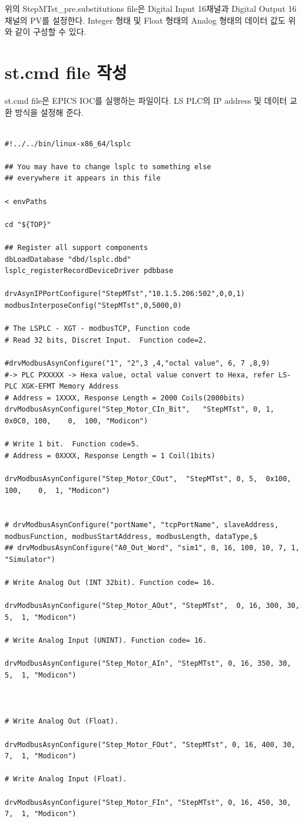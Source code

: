 \documentclass[11pt
  , a4paper
  , article
  , oneside
]{memoir}
\begin{document}
위의 StepMTst\_pre.substitutions file은 Digital Input 16채널과 Digital Output 16채널의 PV를 설정한다. Integer 형태 및 Float 형태의 Analog 형태의 데이터 값도 위와 같이 구성할 수 있다.

\section{st.cmd file 작성}

st.cmd file은 EPICS IOC를 실행하는 파일이다. LS PLC의 IP address 및 데이터 교환 방식을 설정해 준다.  

\begin{lstlisting}[style=termstyle]
	
#!../../bin/linux-x86_64/lsplc

## You may have to change lsplc to something else
## everywhere it appears in this file

< envPaths

cd "${TOP}"

## Register all support components
dbLoadDatabase "dbd/lsplc.dbd"
lsplc_registerRecordDeviceDriver pdbbase

drvAsynIPPortConfigure("StepMTst","10.1.5.206:502",0,0,1)
modbusInterposeConfig("StepMTst",0,5000,0)

# The LSPLC - XGT - modbusTCP, Function code
# Read 32 bits, Discret Input.  Function code=2.

#drvModbusAsynConfigure("1", "2",3 ,4,"octal value", 6, 7 ,8,9)
#-> PLC PXXXXX -> Hexa value, octal value convert to Hexa, refer LS-PLC XGK-EFMT Memory Address
# Address = 1XXXX, Response Length = 2000 Coils(2000bits)
drvModbusAsynConfigure("Step_Motor_CIn_Bit",   "StepMTst", 0, 1,  0x0C0, 100,    0,  100, "Modicon")

# Write 1 bit.  Function code=5.
# Address = 0XXXX, Response Length = 1 Coil(1bits)

drvModbusAsynConfigure("Step_Motor_COut",  "StepMTst", 0, 5,  0x100,  100,    0,  1, "Modicon")


# drvModbusAsynConfigure("portName", "tcpPortName", slaveAddress, modbusFunction, modbusStartAddress, modbusLength, dataType,$
## drvModbusAsynConfigure("A0_Out_Word", "sim1", 0, 16, 100, 10, 7, 1, "Simulator")

# Write Analog Out (INT 32bit). Function code= 16.

drvModbusAsynConfigure("Step_Motor_AOut", "StepMTst",  0, 16, 300, 30,   5,  1, "Modicon")

# Write Analog Input (UNINT). Function code= 16.

drvModbusAsynConfigure("Step_Motor_AIn", "StepMTst", 0, 16, 350, 30,  5,  1, "Modicon")



# Write Analog Out (Float).

drvModbusAsynConfigure("Step_Motor_FOut", "StepMTst", 0, 16, 400, 30,   7,  1, "Modicon")

# Write Analog Input (Float).

drvModbusAsynConfigure("Step_Motor_FIn", "StepMTst", 0, 16, 450, 30,   7,  1, "Modicon")


	
\end{lstlisting}
\end{document}
